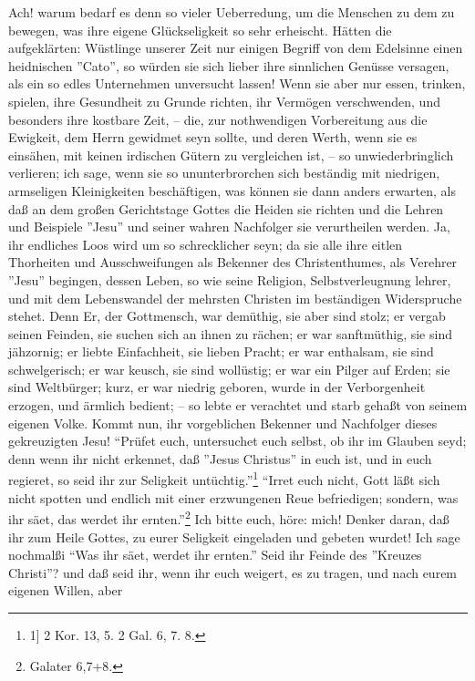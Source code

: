 \medskip

Ach! warum bedarf es denn so vieler Ueberredung, um die Menschen zu dem zu
bewegen, was ihre eigene Glückseligkeit so sehr erheischt. Hätten die
aufgeklärten: Wüstlinge unserer Zeit nur einigen Begriff von dem Edelsinne einen
heidnischen ''Cato'', so würden sie sich lieber ihre sinnlichen Genüsse
versagen, als ein so edles Unternehmen unversucht lassen! Wenn sie aber nur
essen, trinken, spielen, ihre Gesundheit zu Grunde richten, ihr Vermögen
verschwenden, und besonders ihre kostbare Zeit, – die, zur nothwendigen
Vorbereitung aus die Ewigkeit, dem Herrn gewidmet seyn sollte, und deren Werth,
wenn sie es einsähen, mit keinen irdischen Gütern zu vergleichen ist, – so
unwiederbringlich verlieren; ich sage, wenn sie so ununterbrorchen sich
beständig mit niedrigen, armseligen Kleinigkeiten beschäftigen, was können sie
dann anders erwarten, als daß an dem großen Gerichtstage Gottes die Heiden sie
richten und die Lehren und Beispiele ''Jesu'' und seiner wahren Nachfolger sie
verurtheilen werden. Ja, ihr endliches Loos wird um so schrecklicher seyn; da
sie alle ihre eitlen Thorheiten und Ausschweifungen als Bekenner des
Christenthumes, als Verehrer ''Jesu'' begingen, dessen Leben, so wie seine
Religion, Selbstverleugnung lehrer, und mit dem Lebenswandel der mehrsten
Christen im beständigen Widerspruche stehet. Denn Er, der Gottmensch, war
demüthig, sie aber sind stolz; er vergab seinen Feinden, sie suchen sich an
ihnen zu rächen; er war sanftmüthig, sie sind jähzornig; er liebte Einfachheit,
sie lieben Pracht; er war enthalsam, sie sind schwelgerisch; er war keusch, sie
sind wollüstig; er war ein Pilger auf Erden; sie sind Weltbürger; kurz, er war
niedrig geboren, wurde in der Verborgenheit erzogen, und ärmlich  bedient; – so
lebte er verachtet und starb gehaßt von seinem eigenen Volke. Kommt nun, ihr
vorgeblichen Bekenner und Nachfolger dieses gekreuzigten Jesu! "`Prüfet euch,
untersuchet euch selbst, ob ihr im Glauben seyd; denn wenn ihr nicht erkennet,
daß ''Jesus Christus'' in euch ist, und in euch regieret, so seid ihr zur
Seligkeit untüchtig."'\footnote{1] 2 Kor. 13, 5. 2 Gal. 6, 7. 8.}  "`Irret euch
nicht, Gott läßt sich nicht spotten und endlich mit einer erzwungenen Reue
befriedigen; sondern, was ihr säet, das werdet ihr ernten."'\footnote{Galater
6,7+8.} Ich bitte euch, höre: mich! Denker daran, daß ihr zum Heile Gottes, zu
eurer Seligkeit eingeladen und gebeten wurdet! Ich sage nochmalßi "`Was ihr
säet, werdet ihr ernten."' Seid ihr Feinde des ''Kreuzes Christi''? und daß seid
ihr, wenn ihr euch weigert, es zu tragen, und nach eurem eigenen Willen, aber
